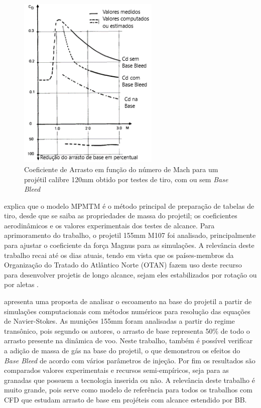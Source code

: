 \begin{figure}[!ht]
	\centering
    \includegraphics[width=0.6\textwidth]{foto05-grafico2-andersson1976.png}
	\caption[Coeficiente de Arrasto em função do número de Mach para um projétil calibre 120mm obtido por testes de tiro, com ou sem \textit{Base Bleed}.]{Coeficiente de Arrasto em função do número de Mach para um projétil calibre 120mm obtido por testes de tiro, com ou sem \textit{Base Bleed} \cite{Andersson1976}}
	\label{fig5:andersson1976}
\end{figure}

\citeauthor{Lieske1966} explica que o modelo MPMTM é o método principal de preparação de tabelas de tiro, desde que se saiba as propriedades de massa do projetil; os coeficientes aerodinâmicos e os valores experimentais dos testes de alcance. Para aprimoramento do trabalho, o projetil 155mm M107 foi analisado, principalmente para ajustar o coeficiente da força Magnus para as simulações. A relevância deste trabalho recai até os dias atuais, tendo em vista que os países-membros da Organização do Tratado do Atlântico Norte (OTAN) fazem uso deste recurso para desenvolver projetis de longo alcance, sejam eles estabilizados por rotação ou por aletas \cite{stanag4355}.

\citeauthor{Sahu1985} apresenta uma proposta de analisar o escoamento na base do projetil a partir de simulações computacionais com métodos numéricos para resolução das equações de Navier-Stokes. As munições 155mm foram analisadas a partir do regime transônico, pois segundo os autores, o arrasto de base representa 50\% de todo o arrasto presente na dinâmica de voo. Neste trabalho, também é possível verificar a adição de massa de gás na base do projetil, o que demonstrou os efeitos do \textit{Base Bleed} de acordo com vários parâmetros de injeção. Por fim os resultados são comparados valores experimentais e recursos semi-empíricos, seja para as granadas que possuem a tecnologia inserida ou não. A relevância deste trabalho é muito grande, pois serve como modelo de referência para todos os trabalhos com CFD que estudam arrasto de base em projéteis com alcance estendido por BB.

